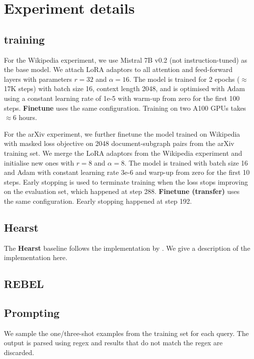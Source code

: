 \appendix

\chapter{Experiment details}  \label{appendix:exp-details}

\section{\name training}  \label{appendix:training-details}

For the Wikipedia experiment, we use Mistral 7B v0.2 (not instruction-tuned) \cite{jiang2023mistral} as the base model. We attach LoRA \cite{hu2021lora} adaptors to all attention and feed-forward layers with parameters $r=32$ and $\alpha=16$. The model is trained for 2 epochs ($\approx$ 17K steps) with batch size 16, context length 2048, and is optimised with Adam using a constant learning rate of 1e-5 with warm-up from zero for the first 100 steps. \textbf{Finetune} uses the same configuration. Training on two A100 GPUs takes $\approx 6$ hours.

For the arXiv experiment, we further finetune the model trained on Wikipedia with masked loss objective on 2048 document-subgraph pairs from the arXiv training set. We merge the LoRA adaptors from the Wikipedia experiment and initialise new ones with $r=8$ and $\alpha=8$. The model is trained with batch size 16 and Adam with constant learning rate 3e-6 and warp-up from zero for the first 10 steps. Early stopping is used to terminate training when the loss stops improving on the evaluation set, which happened at step 288. \textbf{Finetune (transfer)} uses the same configuration. Eearly stopping happened at step 192.

\section{Hearst}

The \textbf{Hearst} baseline follows the implementation by \citet{roller2018hearst}. We give a description of the implementation here. 

\section{REBEL}

\section{Prompting}
We sample the one/three-shot examples from the training set for each query. The output is parsed using regex and results that do not match the regex are discarded.

